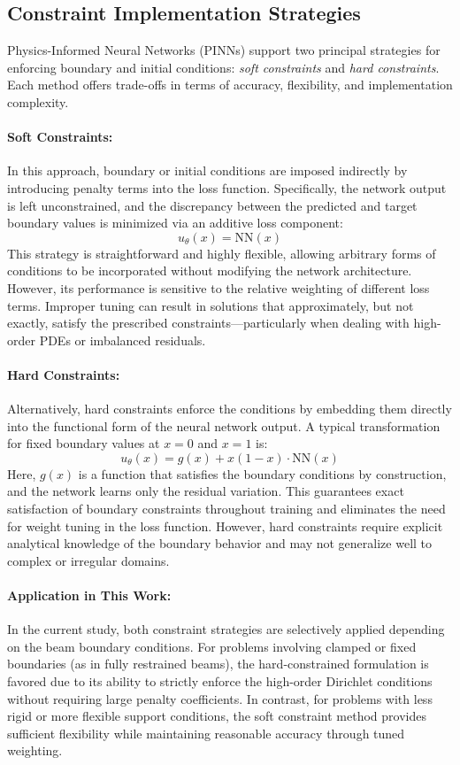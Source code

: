 \documentclass[12pt]{article}
\begin{document}
\subsection{Constraint Implementation Strategies}

Physics-Informed Neural Networks (PINNs) support two principal strategies for enforcing boundary and initial conditions: \textit{soft constraints} and \textit{hard constraints}. Each method offers trade-offs in terms of accuracy, flexibility, and implementation complexity.

\paragraph{Soft Constraints:} 
In this approach, boundary or initial conditions are imposed indirectly by introducing penalty terms into the loss function. Specifically, the network output is left unconstrained, and the discrepancy between the predicted and target boundary values is minimized via an additive loss component:
\[
u_\theta(x) = \text{NN}(x)
\]
This strategy is straightforward and highly flexible, allowing arbitrary forms of conditions to be incorporated without modifying the network architecture. However, its performance is sensitive to the relative weighting of different loss terms. Improper tuning can result in solutions that approximately, but not exactly, satisfy the prescribed constraints—particularly when dealing with high-order PDEs or imbalanced residuals.

\paragraph{Hard Constraints:} 
Alternatively, hard constraints enforce the conditions by embedding them directly into the functional form of the neural network output. A typical transformation for fixed boundary values at $x=0$ and $x=1$ is:
\[
u_\theta(x) = g(x) + x(1 - x)\cdot \text{NN}(x)
\]
Here, $g(x)$ is a function that satisfies the boundary conditions by construction, and the network learns only the residual variation. This guarantees exact satisfaction of boundary constraints throughout training and eliminates the need for weight tuning in the loss function. However, hard constraints require explicit analytical knowledge of the boundary behavior and may not generalize well to complex or irregular domains.

\paragraph{Application in This Work:} 
In the current study, both constraint strategies are selectively applied depending on the beam boundary conditions. For problems involving clamped or fixed boundaries (as in fully restrained beams), the hard-constrained formulation is favored due to its ability to strictly enforce the high-order Dirichlet conditions without requiring large penalty coefficients. In contrast, for problems with less rigid or more flexible support conditions, the soft constraint method provides sufficient flexibility while maintaining reasonable accuracy through tuned weighting.
\end{document}
